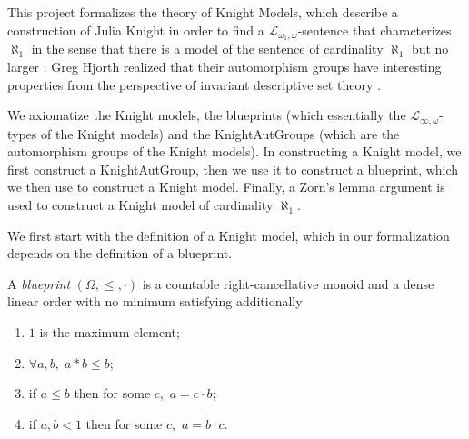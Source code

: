 %

This project formalizes the theory of Knight Models, which describe a construction of Julia Knight in order to find a $\mathcal{L}_{\omega_1, \omega}$-sentence that characterizes $\aleph_1$ in the sense that there is a model of the sentence of cardinality $\aleph_1$ but no larger \cite{Knight1977}.
Greg Hjorth realized that their automorphism groups have interesting properties from the perspective of invariant descriptive set theory \cite{Hjorth1999} \cite{Hjorth2002Knight} \cite{Hjorth2010}.

We axiomatize the Knight models, the blueprints (which essentially the $\mathcal{L}_{\infty, \omega}$-types of the Knight models) and the KnightAutGroups (which are the automorphism groups of the Knight models).
In constructing a Knight model, we first construct a KnightAutGroup, then we use it to construct a blueprint, which we then use to construct a Knight model.
Finally, a Zorn's lemma argument is used to construct a Knight model of cardinality $\aleph_1$.

We first start with the definition of a Knight model, which in our formalization depends on the definition of a blueprint.

\begin{definition}[Blueprint]
  \label{def:blueprint}
  \leanok
  A \emph{blueprint} $(\Omega, {\le}, {\cdot})$ is a countable right-cancellative monoid and a dense linear order with no minimum satisfying additionally
  \begin{enumerate}
  \item $1$ is the maximum element;
  \item $\forall a, b, \; a * b \le b$;
  \item if $a \le b$ then for some $c$,\ $a = c \cdot b$;
  \item if $a, b < 1$ then for some $c$,\ $a = b \cdot c$.
  \end{enumerate}
\end{definition}

